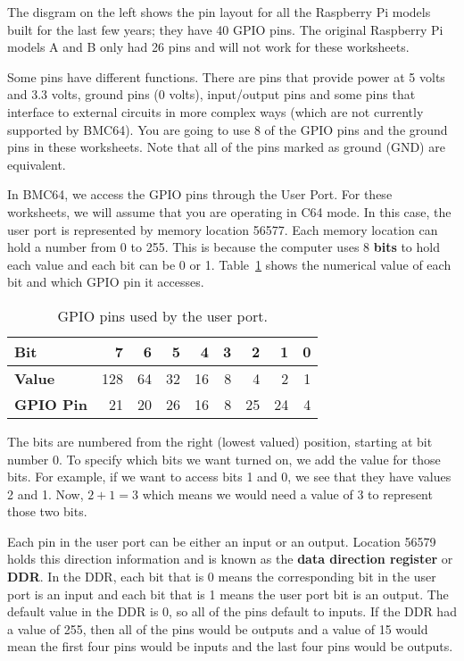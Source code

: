 The disgram on the left shows the pin layout for all the Raspberry Pi models built for the last few years; they have 40 GPIO pins.  The original Raspberry Pi models A and B only had 26 pins and will not work for these worksheets.

Some pins have different functions.  There are pins that provide power at 5 volts and 3.3 volts, ground pins (0 volts), input/output pins and some pins that interface to external circuits in more complex ways (which are not currently supported by BMC64).  You are going to use 8 of the GPIO pins and the ground pins in these worksheets.  Note that all of the pins marked as ground (GND) are equivalent.

In BMC64, we access the GPIO pins through the User Port.  For these worksheets, we will assume that you are operating in C64 mode.  In this case, the user port is represented by memory location 56577.  Each memory location can hold a number from 0 to 255.  This is because the computer uses 8 \textbf{bits} to hold each value and each bit can be 0 or 1.  Table~\ref{tbl:port-pins} shows the numerical value of each bit and which GPIO pin it accesses.

\begin{table}[htb]
\caption{GPIO pins used by the user port.}\label{tbl:port-pins}
\begin{center}
\begin{tabular}{|l|r|r|r|r|r|r|r|r|}
\hline
\textbf{Bit}      &   7 &  6 &  5 &  4 &  3 &  2 &  1 &  0 \\
\hline
\textbf{Value}    & 128 & 64 & 32 & 16 &  8 &  4 &  2 &  1 \\
\hline
\textbf{GPIO Pin} &  21 & 20 & 26 & 16 &  8 & 25 & 24 &  4 \\
\hline
\end{tabular}
\end{center}
\end{table}

The bits are numbered from the right (lowest valued) position, starting at bit number 0.  To specify which bits we want turned on, we add the value for those bits.  For example, if we want to access bits 1 and 0, we see that they have values 2 and 1.  Now, $2+1 = 3$ which means we would need a value of 3 to represent those two bits.

Each pin in the user port can be either an input or an output.  Location 56579 holds this direction information and is known as the \textbf{data direction register} or \textbf{DDR}.  In the DDR, each bit that is 0 means the corresponding bit in the user port is an input and each bit that is 1 means the user port bit is an output.  The default value in the DDR is 0, so all of the pins default to inputs.  If the DDR had a value of 255, then all of the pins would be outputs and a value of 15 would mean the first four pins would be inputs and the last four pins would be outputs.

